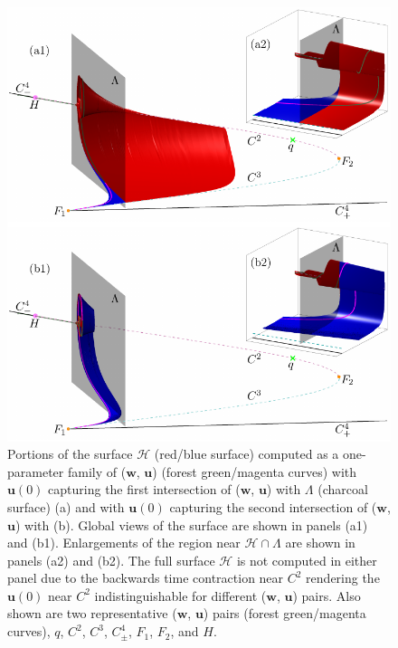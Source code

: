 \documentclass{ws-ijbc}
\begin{document}
\begin{figure}[H]
\centering
\includegraphics[]{./figures/MKMO_14.pdf}
\caption{Portions of the surface $\mathscr{H}$ (red/blue surface) computed as a one-parameter family of ($\mathbf{w}$, $\mathbf{u}$) (forest green/magenta curves) with $\mathbf{u}(0)$ capturing the first intersection of ($\mathbf{w}$, $\mathbf{u}$) with $\Lambda$ (charcoal surface) (a) and with $\mathbf{u}(0)$ capturing the second intersection of ($\mathbf{w}$, $\mathbf{u}$) with (b).  Global views of the surface are shown in panels (a1) and (b1).  Enlargements of the region near $\mathscr{H} \cap \Lambda$ are shown in panels (a2) and (b2).  The full surface $\mathscr{H}$ is not computed in either panel due to the backwards time contraction near $C^2$ rendering the $\mathbf{u}(0)$ near $C^2$ indistinguishable for different ($\mathbf{w}$, $\mathbf{u}$) pairs.  Also shown are two representative ($\mathbf{w}$, $\mathbf{u}$) pairs (forest green/magenta curves), $q$, $C^2$, $C^3$, $C^4_\pm$, $F_1$, $F_2$, and $H$.}
\label{figure_14}
\end{figure}
\end{document}
